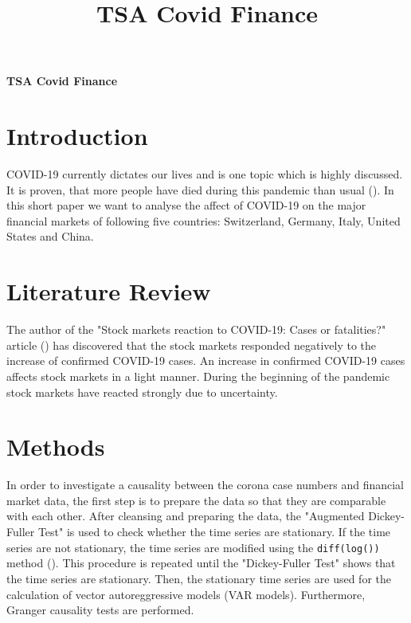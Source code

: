 \documentclass[11pt]{article}
\title{TSA Covid Finance}
\begin{document}
\begin{center}
\textbf{\Large TSA Covid Finance}    
\end{center}


\section{Introduction}
COVID-19 currently dictates our lives and is one topic which is highly discussed. It is proven, that more people have died during this pandemic than usual (\cite{owidcoronavirus}). In this short paper we want to analyse the affect of COVID-19 on the major financial markets of following five countries: Switzerland, Germany, Italy, United States and China.

\section{Literature Review}
The author of the "Stock markets reaction to COVID-19: Cases or fatalities?" article (\cite{stock-covid-reaction}) has discovered that the stock markets responded negatively to the increase of confirmed COVID-19 cases. An increase in confirmed COVID-19 cases affects stock markets in a light manner. During the beginning of the pandemic stock markets have reacted strongly due to uncertainty.



\section{Methods}
In order to investigate a causality between the corona case numbers and financial market data, the first step is to prepare the data so that they are comparable with each other. After cleansing and preparing the data, the "Augmented Dickey-Fuller Test" is used to check whether the time series are stationary. If the time series are not stationary, the time series are modified using the \lstinline{diff(log())} method (). This procedure is repeated until the "Dickey-Fuller Test" shows that the time series are stationary. Then, the stationary time series are used for the calculation of vector autoreggressive models (VAR models). Furthermore, Granger causality tests are performed.
\end{document}
